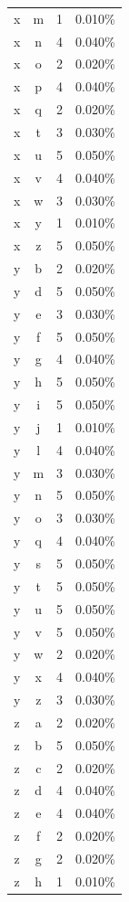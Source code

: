 \begin{longtable}{cccc}
    x & m & 1 & 0.010\% \\
    x & n & 4 & 0.040\% \\
    x & o & 2 & 0.020\% \\
    x & p & 4 & 0.040\% \\
    x & q & 2 & 0.020\% \\
    x & t & 3 & 0.030\% \\
    x & u & 5 & 0.050\% \\
    x & v & 4 & 0.040\% \\
    x & w & 3 & 0.030\% \\
    x & y & 1 & 0.010\% \\
    x & z & 5 & 0.050\% \\
    y & b & 2 & 0.020\% \\
    y & d & 5 & 0.050\% \\
    y & e & 3 & 0.030\% \\
    y & f & 5 & 0.050\% \\
    y & g & 4 & 0.040\% \\
    y & h & 5 & 0.050\% \\
    y & i & 5 & 0.050\% \\
    y & j & 1 & 0.010\% \\
    y & l & 4 & 0.040\% \\
    y & m & 3 & 0.030\% \\
    y & n & 5 & 0.050\% \\
    y & o & 3 & 0.030\% \\
    y & q & 4 & 0.040\% \\
    y & s & 5 & 0.050\% \\
    y & t & 5 & 0.050\% \\
    y & u & 5 & 0.050\% \\
    y & v & 5 & 0.050\% \\
    y & w & 2 & 0.020\% \\
    y & x & 4 & 0.040\% \\
    y & z & 3 & 0.030\% \\
    z & a & 2 & 0.020\% \\
    z & b & 5 & 0.050\% \\
    z & c & 2 & 0.020\% \\
    z & d & 4 & 0.040\% \\
    z & e & 4 & 0.040\% \\
    z & f & 2 & 0.020\% \\
    z & g & 2 & 0.020\% \\
    z & h & 1 & 0.010\% \\

\end{longtable}
